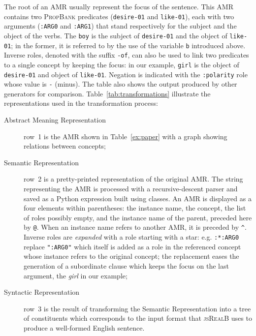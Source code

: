 \documentclass[12pt]{article}
\newcommand{\systeme}[1]{\textsc{#1}}
\newcommand{\jsr}{\systeme{jsRealB}}
\newcommand{\propbank}{\systeme{PropBank}}
\newcommand{\representation}[1]{\textsf{#1}}
\newcommand{\amr}{\representation{Abstract Meaning Representation}}
\newcommand{\AMR}{\representation{AMR}}
\newcommand{\semr}{\representation{Semantic Representation}}
\newcommand{\syntr}{\representation{Syntactic Representation}}
\begin{document}
The root of an \AMR{} usually represent the focus of the sentence. This \AMR{} contains two \propbank{} predicates (\texttt{desire-01} and \texttt{like-01}), each with two arguments (\texttt{:ARG0} and \texttt{:ARG1}) that stand respectively for the subject and the object of the verbs. The \texttt{boy} is the subject of \texttt{desire-01} and the object of \texttt{like-01}; in the former, it is referred to by the use of the variable \texttt{b} introduced above. Inverse roles, denoted with the suffix \texttt{-of}, can also be used to link two predicates to a single concept by keeping the focus: in our example, \texttt{girl} is the object of \texttt{desire-01} and object of \texttt{like-01}. Negation is indicated with the \texttt{:polarity} role whose value is \texttt{-} (minus). The table also shows the output produced by other generators for comparison. Table~\ref{tab:transformations} illustrate the representations used in the transformation process:
\begin{description}
 \item[\amr{}] row~1 is the AMR shown in Table~\ref{ex:paper} with a graph showing relations between concepts;
 \item[\semr{}] row~2 is a pretty-printed representation of the original \AMR{}. The string representing the AMR is processed with a recursive-descent parser and saved as a Python expression built using classes. An \AMR{} is displayed as a four elements within parentheses: the instance name, the concept, the list of roles possibly empty, and the instance name of the parent, preceded here by \verb+@+. When an instance name refers to another AMR, it is preceded by \verb+^+. Inverse roles are \emph{expanded} with a role starting with a star: e.g. \lstinline{:*:ARG0} replace \lstinline{":ARG0"} which itself is added as a role in the referenced concept whose instance refers to the original concept; the replacement eases the generation of a subordinate clause which keeps the focus on the last argument, the \emph{girl} in our example;
 \item[\syntr{}] row~3 is the result of transforming the Semantic Representation into a tree of constituents which corresponds to the input format that \jsr{} uses to produce a well-formed English sentence.
\end{description}
\end{document}
